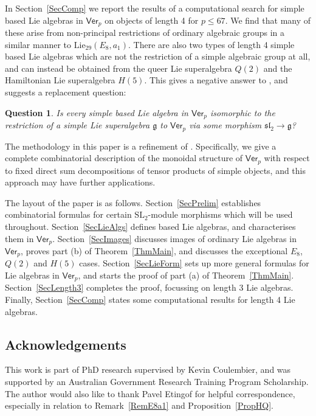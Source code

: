 \documentclass[11pt,a4paper,reqno]{amsart}
\newtheorem{ques}[thm]{Question}
\theoremstyle{definition}
\numberwithin{equation}{section}
\newcommand{\Ver}{\mathsf{Ver}}
\newcommand{\fg}{\mathfrak{g}}
\newcommand{\fsl}{\mathfrak{sl}}
\newcommand{\Lie}{\mathrm{Lie}}
\newcommand{\SL}{\mathrm{SL}}
\begin{document}
In Section~\ref{SecComp} we report the results of a computational search for simple based Lie algebras in $\Ver_p$ on objects of length 4 for $p\leq67$. We find that many of these arise from non-principal restrictions of ordinary algebraic groups in a similar manner to $\Lie_{29}(E_8,a_1)$. There are also two types of length 4 simple based Lie algebras which are not the restriction of a simple algebraic group at all, and can instead be obtained from the queer Lie superalgebra $Q(2)$ and the Hamiltonian Lie superalgebra $H(5)$. This gives a negative answer to \cite[Question~4.6]{asymptotic}, and suggests a replacement question:

\begin{ques}
Is every simple based Lie algebra in $\Ver_p$ isomorphic to the restriction of a simple Lie superalgebra $\fg$ to $\Ver_p$ via some morphism $\fsl_2\to\fg$?
\end{ques}

The methodology in this paper is a refinement of \cite[\S4.2]{CEN}. Specifically, we give a complete combinatorial description of the monoidal structure of $\Ver_p$ with respect to fixed direct sum decompositions of tensor products of simple objects, and this approach may have further applications.

The layout of the paper is as follows. Section~\ref{SecPrelim} establishes combinatorial formulas for certain $\SL_2$-module morphisms which will be used throughout. Section~\ref{SecLieAlgs} defines based Lie algebras, and characterises them in $\Ver_p$. Section~\ref{SecImages} discusses images of ordinary Lie algebras in $\Ver_p$, proves part (b) of Theorem~\ref{ThmMain}, and discusses the exceptional $E_8$, $Q(2)$ and $H(5)$ cases. Section~\ref{SecLieForm} sets up more general formulas for Lie algebras in $\Ver_p$, and starts the proof of part (a) of Theorem~\ref{ThmMain}. Section~\ref{SecLength3} completes the proof, focussing on length 3 Lie algebras. Finally, Section~\ref{SecComp} states some computational results for length 4 Lie algebras.

\subsection*{Acknowledgements} This work is part of PhD research supervised by Kevin Coulembier, and was supported by an Australian Government Research Training Program Scholarship. The author would also like to thank Pavel Etingof for helpful correspondence, especially in relation to Remark~\ref{RemE8a1} and Proposition~\ref{PropHQ}.
\end{document}
